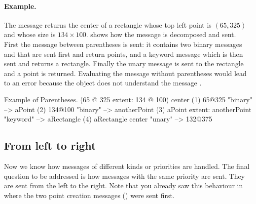 \documentclass[a4paper,10pt,twoside]{book}
\begin{document}
\paragraph{Example.}
The message  returns the center of a rectangle whose top left point is $(65, 325)$ and whose size is $134{\times}100$.  shows how the message is decomposed and sent. First the message between parentheses is sent: it contains two binary messages  and  that are sent first and return points, and a keyword message  which is then sent and returns a rectangle. Finally the unary message  is sent to the rectangle and a point is returned. 
Evaluating the message without parentheses would lead to an error because the object  does not understand the message .

\begin{example}[decExtent]{Example of Parentheses.}{}
      (65 @ 325 extent: 134 @ 100) center
(1)   65@325                                                    "binary"
    --> aPoint
(2)                                134@100                     "binary"
                                 --> anotherPoint
(3)   aPoint extent: anotherPoint                       "keyword"
      --> aRectangle
(4)   aRectangle center                                     "unary"
      --> 132@375
\end{example}

\subsection{From left to right}
Now we know how messages of different kinds or priorities are handled. The final question to be addressed is how messages with the same priority are sent. They are sent from the left to the right. Note that you already saw this behaviour in  where the two point creation messages () were sent first.


\end{document}
